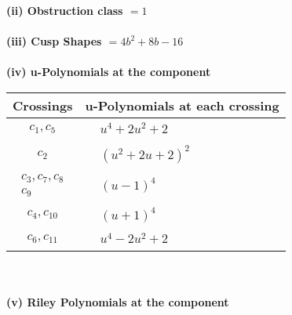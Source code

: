 \documentclass[1p]{elsarticle_modified}
\theoremstyle{definition}
\begin{document}
\flushleft \textbf{(ii) Obstruction class $= 1$}\\~\\
\flushleft \textbf{(iii) Cusp Shapes $= 4 b^2+8 b-16$}\\~\\
\newpage\renewcommand{\arraystretch}{1}
\flushleft \textbf{(iv) u-Polynomials at the component}\newline \\
\begin{tabular}{m{50pt}|m{274pt}}
Crossings & \hspace{64pt}u-Polynomials at each crossing \\
\hline $$\begin{aligned}c_{1},c_{5}\end{aligned}$$&$\begin{aligned}
&u^4+2 u^2+2
\end{aligned}$\\
\hline $$\begin{aligned}c_{2}\end{aligned}$$&$\begin{aligned}
&(u^2+2 u+2)^2
\end{aligned}$\\
\hline $$\begin{aligned}c_{3},c_{7},c_{8}\\c_{9}\end{aligned}$$&$\begin{aligned}
&(u-1)^4
\end{aligned}$\\
\hline $$\begin{aligned}c_{4},c_{10}\end{aligned}$$&$\begin{aligned}
&(u+1)^4
\end{aligned}$\\
\hline $$\begin{aligned}c_{6},c_{11}\end{aligned}$$&$\begin{aligned}
&u^4-2 u^2+2
\end{aligned}$\\
\hline
\end{tabular}\\~\\
\newpage\renewcommand{\arraystretch}{1}
\flushleft \textbf{(v) Riley Polynomials at the component}\newline \\
\end{document}
